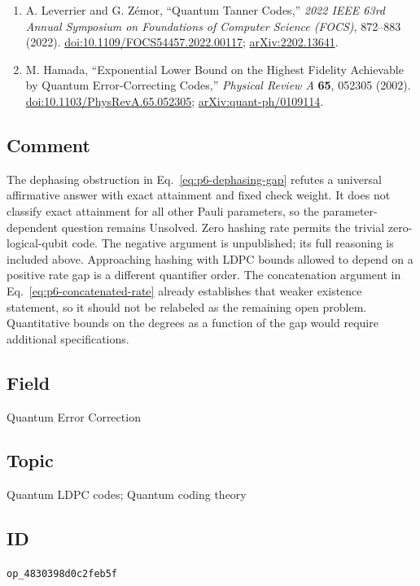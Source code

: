 \begin{enumerate}[label={},leftmargin=4.8em,labelsep=0.5em]
  \item[\textup{[LZ22]}]\label{ref:p6-tanner}
  A. Leverrier and G. Z\'emor, ``Quantum Tanner Codes,''
\emph{2022 IEEE 63rd Annual Symposium on Foundations of Computer Science
(FOCS)}, 872--883 (2022).
\href{https://doi.org/10.1109/FOCS54457.2022.00117}{doi:10.1109/FOCS54457.2022.00117};
\href{https://arxiv.org/abs/2202.13641}{arXiv:2202.13641}.

  \item[\textup{[Ham02]}]\label{ref:p6-hamada}
  M. Hamada, ``Exponential Lower Bound on the Highest Fidelity Achievable
by Quantum Error-Correcting Codes,'' \emph{Physical Review A}
\textbf{65}, 052305 (2002).
\href{https://doi.org/10.1103/PhysRevA.65.052305}{doi:10.1103/PhysRevA.65.052305};
\href{https://arxiv.org/abs/quant-ph/0109114}{arXiv:quant-ph/0109114}.
\end{enumerate}

\subsection*{Comment}

The dephasing obstruction in Eq.~\eqref{eq:p6-dephasing-gap} refutes a
universal affirmative answer with exact attainment and fixed check weight.
It does not classify exact attainment for all other Pauli parameters, so the
parameter-dependent question remains Unsolved. Zero hashing rate permits
the trivial zero-logical-qubit code. The negative argument is unpublished;
its full reasoning is included above. Approaching hashing with LDPC bounds
allowed to depend on a positive rate gap is a different quantifier order. The concatenation argument in
Eq.~\eqref{eq:p6-concatenated-rate} already establishes that weaker
existence statement, so it should not be relabeled as the remaining open
problem. Quantitative bounds on the degrees as a function of the gap would
require additional specifications.

\subsection*{Field}

Quantum Error Correction

\subsection*{Topic}

Quantum LDPC codes; Quantum coding theory

\subsection*{ID}

\texttt{op\_4830398d0c2feb5f}
